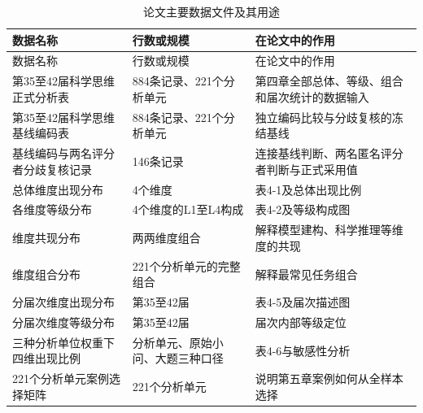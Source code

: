 \documentclass[
  12pt,
  a4paper,twoside,openany]{ctexbook}
\begin{document}
\begin{longtable}[]{@{}
  >{\raggedright\arraybackslash}p{}
  >{\raggedleft\arraybackslash}p{}
  >{\raggedright\arraybackslash}p{}@{}}
\caption{论文主要数据文件及其用途}\tabularnewline
\toprule\noalign{}
\rowcolor{ThesisPale}
\begin{minipage}[b]{\linewidth}\raggedright
数据名称
\end{minipage} & \begin{minipage}[b]{\linewidth}\raggedleft
行数或规模
\end{minipage} & \begin{minipage}[b]{\linewidth}\raggedright
在论文中的作用
\end{minipage} \\
\midrule\noalign{}
\endfirsthead
\toprule\noalign{}
\rowcolor{ThesisPale}
\begin{minipage}[b]{\linewidth}\raggedright
数据名称
\end{minipage} & \begin{minipage}[b]{\linewidth}\raggedleft
行数或规模
\end{minipage} & \begin{minipage}[b]{\linewidth}\raggedright
在论文中的作用
\end{minipage} \\
\midrule\noalign{}
\endhead
\bottomrule\noalign{}
\endlastfoot
第35至42届科学思维正式分析表 & 884条记录、221个分析单元 &
第四章全部总体、等级、组合和届次统计的数据输入 \\
第35至42届科学思维基线编码表 & 884条记录、221个分析单元 &
独立编码比较与分歧复核的冻结基线 \\
基线编码与两名评分者分歧复核记录 & 146条记录 &
连接基线判断、两名匿名评分者判断与正式采用值 \\
总体维度出现分布 & 4个维度 & 表4-1及总体出现比例 \\
各维度等级分布 & 4个维度的L1至L4构成 & 表4-2及等级构成图 \\
维度共现分布 & 两两维度组合 & 解释模型建构、科学推理等维度的共现 \\
维度组合分布 & 221个分析单元的完整组合 & 解释最常见任务组合 \\
分届次维度出现分布 & 第35至42届 & 表4-5及届次描述图 \\
分届次维度等级分布 & 第35至42届 & 届次内部等级定位 \\
三种分析单位权重下四维出现比例 & 分析单元、原始小问、大题三种口径 &
表4-6与敏感性分析 \\
221个分析单元案例选择矩阵 & 221个分析单元 &
说明第五章案例如何从全样本选择 \\
\end{longtable}
\end{document}
